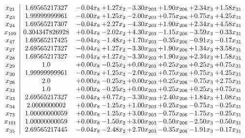 \documentclass[8pt]{article}
\begin{document}
\[\begin{array}{c| c c@{\hskip 2pt} c@{\hskip 2pt} c@{\hskip 2pt} c@{\hskip 2pt} c@{\hskip 2pt} c@{\hskip 2pt} }
 x_{21}   &  1.69565217327 & -0.04 x_{8} & +  1.27 x_{2} & -3.30 x_{203} & +  1.90 x_{206} & +  2.34 x_{3} & +  1.58 x_{31}\\
 x_{23}   &  1.99999999961 & -0.00 x_{8} & +  1.25 x_{2} & -2.00 x_{203} & +  0.75 x_{206} & +  0.75 x_{3} & +  4.25 x_{31}\\
 x_{24}   &  1.69565217307 & -0.04 x_{8} & +  2.27 x_{2} & -4.30 x_{203} & +  1.90 x_{206} & +  2.34 x_{3} & +  4.58 x_{31}\\
 x_{109}   &  0.304347826928 & +  0.04 x_{8} & -2.02 x_{2} & +  4.30 x_{203} & -1.15 x_{206} & -3.59 x_{3} & -0.33 x_{31}\\
 x_{47}   &  1.69565217425 & -0.04 x_{8} & -1.48 x_{2} & +  1.70 x_{203} & -0.35 x_{206} & -0.91 x_{3} & -0.17 x_{31}\\
 x_{27}   &  2.69565217327 & -0.04 x_{8} & +  1.27 x_{2} & -3.30 x_{203} & +  1.90 x_{206} & +  1.34 x_{3} & +  3.58 x_{31}\\
 x_{28}   &  1.69565217327 & -0.04 x_{8} & +  1.27 x_{2} & -3.30 x_{203} & +  1.90 x_{206} & +  2.34 x_{3} & +  1.58 x_{31}\\
 x_{29}   &  1.0 & +  0.00 x_{8} & -0.25 x_{2} & +  0.00 x_{203} & +  0.25 x_{206} & +  0.25 x_{3} & +  0.75 x_{31}\\
 x_{30}   &  1.99999999961 & -0.00 x_{8} & +  1.25 x_{2} & -2.00 x_{203} & +  0.75 x_{206} & +  0.75 x_{3} & +  4.25 x_{31}\\
 x_{26}   &  2.0 & +  0.00 x_{8} & -0.25 x_{2} & +  0.00 x_{203} & +  0.25 x_{206} & -0.75 x_{3} & +  2.75 x_{31}\\
 x_{32}   &  1.0 & +  0.00 x_{8} & -0.25 x_{2} & +  0.00 x_{203} & +  0.25 x_{206} & +  0.25 x_{3} & +  0.75 x_{31}\\
 x_{33}   &  2.69565217327 & -0.04 x_{8} & +  0.77 x_{2} & -3.30 x_{203} & +  2.40 x_{206} & +  1.84 x_{3} & +  1.08 x_{31}\\
 x_{34}   &  2.0000000002 & +  0.00 x_{8} & -1.25 x_{2} & +  1.00 x_{203} & +  0.25 x_{206} & -0.75 x_{3} & -0.25 x_{31}\\
 x_{73}   &  1.00000000059 & +  0.00 x_{8} & -1.25 x_{2} & +  3.00 x_{203} & -0.75 x_{206} & -1.75 x_{3} & -0.25 x_{31}\\
 x_{101}   &  1.00000000059 & +  0.00 x_{8} & -1.50 x_{2} & +  3.00 x_{203} & -0.50 x_{206} & -2.50 x_{3} & -0.50 x_{31}\\
 x_{35}   &  2.69565217445 & -0.04 x_{8} & -2.48 x_{2} & +  2.70 x_{203} & -0.35 x_{206} & -1.91 x_{3} & -0.17 x_{31}\\

\end{array}\]
\end{document}
